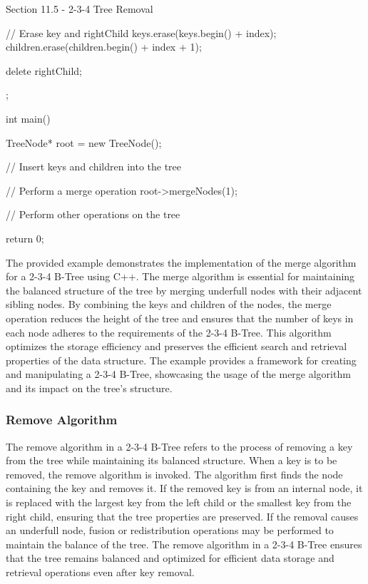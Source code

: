 \begin{notes}{Section 11.5 - 2-3-4 Tree Removal}
\begin{highlight}
\begin{code}[C++]
{{                // Erase key and rightChild
                keys.erase(keys.begin() + index);
                children.erase(children.begin() + index + 1);
        
                delete rightChild;
            }
        };
        
        int main() {
            TreeNode* root = new TreeNode();
        
            // Insert keys and children into the tree
        
            // Perform a merge operation
            root->mergeNodes(1);
        
            // Perform other operations on the tree
        
            return 0;
        }        
        \end{code}
        The provided example demonstrates the implementation of the merge algorithm for a 2-3-4 B-Tree using C++. The merge algorithm is essential for maintaining the balanced structure of the tree by merging underfull nodes with their adjacent sibling nodes. By combining the keys and children of the nodes, the merge operation reduces 
        the height of the tree and ensures that the number of keys in each node adheres to the requirements of the 2-3-4 B-Tree. This algorithm optimizes the storage efficiency and preserves the efficient search and retrieval properties of the data structure. The example provides a framework for creating and manipulating a 2-3-4 B-Tree, 
        showcasing the usage of the merge algorithm and its impact on the tree's structure.
    \end{highlight}
    
    \subsubsection*{Remove Algorithm}
    
    The remove algorithm in a 2-3-4 B-Tree refers to the process of removing a key from the tree while maintaining its balanced structure. When a key is to be removed, the remove algorithm is invoked. The algorithm first finds the node containing the key and removes it. If the removed key is from an internal node, it is replaced with the 
    largest key from the left child or the smallest key from the right child, ensuring that the tree properties are preserved. If the removal causes an underfull node, fusion or redistribution operations may be performed to maintain the balance of the tree. The remove algorithm in a 2-3-4 B-Tree ensures that the tree remains balanced and 
    optimized for efficient data storage and retrieval operations even after key removal.
    

\end{notes}
